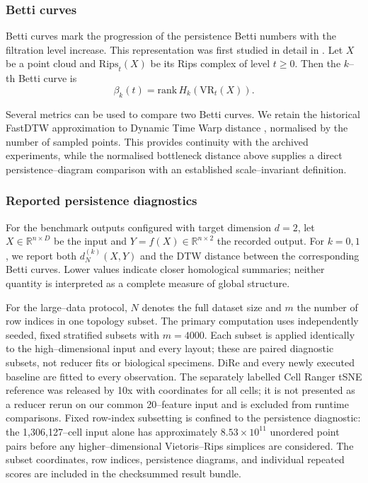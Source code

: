 \documentclass[11pt]{article}
\begin{document}
\subsubsection{Betti curves}

Betti curves mark the progression of the persistence Betti numbers with the filtration level increase. This representation was first studied in detail in \cite{Giusti-et-al}. Let $X$ be a point cloud and $\mathrm{Rips}_t(X)$ be its Rips complex of level $t \geq 0$. Then the $k$--th Betti curve is
\[
\beta_k(t) = \mathrm{rank}\, H_k(\mathrm{VR}_t(X)).
\]

Several metrics can be used to compare two Betti curves. We retain the
historical FastDTW approximation to Dynamic Time Warp distance
\cite{salvador-fastdtw,fastdtw-docs}, normalised by the number of sampled
points. This provides continuity with the archived experiments, while the
normalised bottleneck distance above supplies a direct persistence--diagram
comparison with an established scale--invariant definition.

\subsubsection{Reported persistence diagnostics}

For the benchmark outputs configured with target dimension $d=2$, let
$X \in \mathbb{R}^{n\times D}$ be the input and
$Y=f(X)\in\mathbb{R}^{n\times 2}$ the recorded output. For $k=0,1$, we report
both $d_N^{(k)}(X,Y)$ and the DTW distance between the corresponding Betti
curves. Lower values indicate closer homological summaries; neither quantity
is interpreted as a complete measure of global structure.

For the large--data protocol, $N$ denotes the full dataset size and $m$ the
number of row indices in one topology subset. The primary computation uses
\TopologySubsetCount{} independently seeded, fixed stratified subsets with
$m=4000$. Each subset is applied identically to the high--dimensional input and
every layout; these are paired diagnostic subsets, not reducer fits or
biological specimens. DiRe and every newly executed baseline are fitted
to every observation. The separately labelled Cell Ranger tSNE reference was
released by 10x with coordinates for all cells; it is not presented as a
reducer rerun on our common 20--feature input and is excluded from runtime
comparisons. Fixed row-index subsetting is confined to the persistence
diagnostic: the
1,306,127--cell input alone has
approximately $8.53\times 10^{11}$ unordered point pairs before any
higher--dimensional Vietoris--Rips simplices are considered. The subset
coordinates, row indices, persistence diagrams, and individual repeated scores
are included in the checksummed result bundle.
\end{document}
